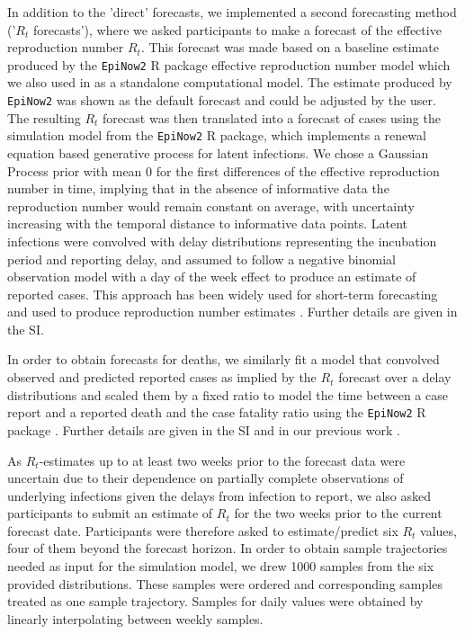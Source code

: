 \documentclass[10pt,a4paper,twocolumn]{article}
\begin{document}
In addition to the 'direct' forecasts, we implemented a second forecasting method ('$R_t$ forecasts'), where we asked participants to make a forecast of the effective reproduction number $R_t$. This forecast was made based on a baseline estimate produced by the \texttt{EpiNow2} \citep{epinow2} \textsf{R} \cite{R} package effective reproduction number model which we also used in \cite{bosseComparingHumanModelbased2022} as a standalone computational model. The estimate produced by \texttt{EpiNow2} was shown as the default forecast and could be adjusted by the user. The resulting $R_t$ forecast was then translated into a forecast of cases using the simulation model from the \texttt{EpiNow2} \textsf{R} package, which implements a renewal equation based \citep{fraserEstimatingIndividualHousehold2007} generative process for latent infections. We chose a Gaussian Process prior with mean 0 for the first differences of the effective reproduction number in time, implying that in the absence of informative data the reproduction number would remain constant on average, with uncertainty increasing with the temporal distance to informative data points. Latent infections were convolved with delay distributions representing the incubation period and reporting delay, and assumed to follow a negative binomial observation model with a day of the week effect to produce an estimate of reported cases. This approach has been widely used for short-term forecasting \cite{bosseComparingHumanModelbased2022, sherrattPredictivePerformanceMultimodel2022a} and used to produce reproduction number estimates \cite{abbottEstimatingIncreaseReproduction2021, abbottEstimatingTimevaryingReproduction2020a, sherrattExploringSurveillanceData2021}. Further details are given in the SI.

In order to obtain forecasts for deaths, we similarly fit a model that convolved observed and predicted reported cases as implied by the $R_t$ forecast over a  delay distributions \cite{sherrattExploringSurveillanceData2021, abbottEstimatingTimevaryingReproduction2020a} and scaled them by a fixed ratio to model the time between a case report and a reported death and the case fatality ratio using the \texttt{EpiNow2} \textsf{R} package \citep{epinow2}. Further details are given in the SI and in our previous work \citep{bosseComparingHumanModelbased2022}.

As $R_t$-estimates up to at least two weeks prior to the forecast data were uncertain due to their dependence on partially complete observations of underlying infections given the delays from infection to report, we also asked participants to submit an estimate of $R_t$ for the two weeks prior to the current forecast date. Participants were therefore asked to estimate/predict six $R_t$ values, four of them beyond the forecast horizon. In order to obtain sample trajectories needed as input for the simulation model, we drew 1000 samples from the six provided distributions. These samples were ordered and corresponding samples treated as one sample trajectory. Samples for daily values were obtained by linearly interpolating between weekly samples. 
\end{document}
